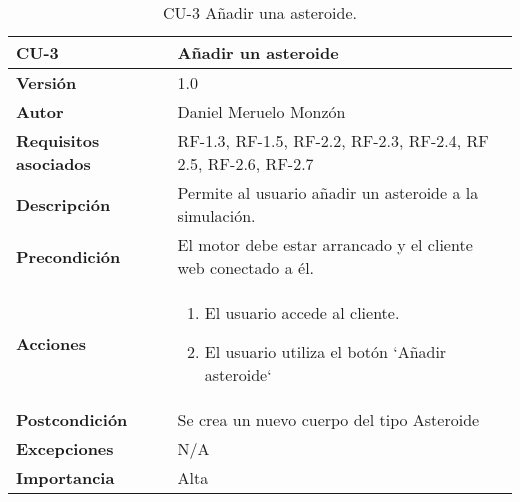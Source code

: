 \begin{table}[p]
	\centering
	\begin{tabularx}{\linewidth}{ p{} p{} }
		\toprule
		\textbf{CU-3}    & \textbf{Añadir un asteroide}\\
		\toprule
		\textbf{Versión}              & 1.0    \\
		\textbf{Autor}                & Daniel Meruelo Monzón \\
		\textbf{Requisitos asociados} & RF-1.3, RF-1.5, RF-2.2, RF-2.3, RF-2.4, RF 2.5, RF-2.6, RF-2.7 \\
		\textbf{Descripción}          & Permite al usuario añadir un asteroide a la simulación. \\
		\textbf{Precondición}         & El motor debe estar arrancado y el cliente web conectado a él. \\
		\textbf{Acciones}             &
		\begin{enumerate}
			\def\labelenumi{\arabic{enumi}.}
			\tightlist
			\item El usuario accede al cliente.
			\item El usuario utiliza el botón `Añadir asteroide`
		\end{enumerate}\\
		\textbf{Postcondición}        & Se crea un nuevo cuerpo del tipo Asteroide \\
		\textbf{Excepciones}          & N/A \\
		\textbf{Importancia}          & Alta\\
		\bottomrule
	\end{tabularx}
	\caption{CU-3 Añadir una asteroide.}
\end{table}
